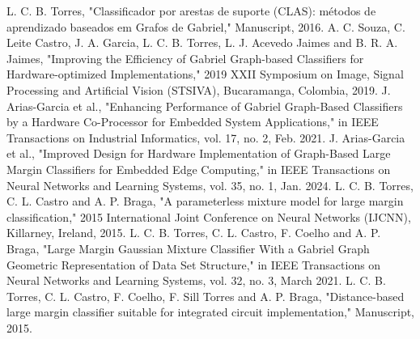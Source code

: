 \documentclass[conference]{IEEEtran}
\begin{document}
\begin{thebibliography}{00}
     L. C. B. Torres, "Classificador por arestas de suporte (CLAS): métodos de aprendizado baseados em Grafos de Gabriel," Manuscript, 2016.
     A. C. Souza, C. Leite Castro, J. A. Garcia, L. C. B. Torres, L. J. Acevedo Jaimes and B. R. A. Jaimes, "Improving the Efficiency of Gabriel Graph-based Classifiers for Hardware-optimized Implementations," 2019 XXII Symposium on Image, Signal Processing and Artificial Vision (STSIVA), Bucaramanga, Colombia, 2019.
     J. Arias-Garcia et al., "Enhancing Performance of Gabriel Graph-Based Classifiers by a Hardware Co-Processor for Embedded System Applications," in IEEE Transactions on Industrial Informatics, vol. 17, no. 2, Feb. 2021.
     J. Arias-Garcia et al., "Improved Design for Hardware Implementation of Graph-Based Large Margin Classifiers for Embedded Edge Computing," in IEEE Transactions on Neural Networks and Learning Systems, vol. 35, no. 1, Jan. 2024.
     L. C. B. Torres, C. L. Castro and A. P. Braga, "A parameterless mixture model for large margin classification," 2015 International Joint Conference on Neural Networks (IJCNN), Killarney, Ireland, 2015.
     L. C. B. Torres, C. L. Castro, F. Coelho and A. P. Braga, "Large Margin Gaussian Mixture Classifier With a Gabriel Graph Geometric Representation of Data Set Structure," in IEEE Transactions on Neural Networks and Learning Systems, vol. 32, no. 3, March 2021.
     L. C. B. Torres, C. L. Castro, F. Coelho, F. Sill Torres and A. P. Braga, "Distance-based large margin classifier suitable for integrated circuit implementation," Manuscript, 2015.


\end{thebibliography}
\end{document}
